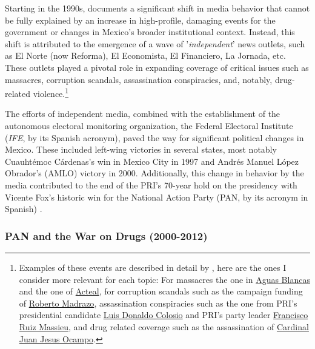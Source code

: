 Starting in the 1990s, \cite{FourthState-Lawson-Book} documents a significant shift in media behavior that cannot be fully explained by an increase in high-profile, damaging events for the government or changes in Mexico's broader institutional context. Instead, this shift is attributed to the emergence of a wave of '\textit{independent}' news outlets, such as El Norte (now Reforma), El Economista, El Financiero, La Jornada, etc. These outlets played a pivotal role in expanding coverage of critical issues such as massacres, corruption scandals, assassination conspiracies, and, notably, drug-related violence.\footnote{Examples of these events are described in detail by \cite{FourthState-Lawson-Book}, here are the ones I consider more relevant for each topic: For massacres the one in \href{https://www.theadvocatesforhumanrights.org/Res/guerrero_1995_2.pdf}{Aguas Blancas} and the one of \href{https://www.amnesty.org/en/wp-content/uploads/2021/06/amr410431998en.pdf}{Acteal}, for corruption scandals such as the campaign funding of \href{https://elpais.com/diario/2000/10/25/internacional/972424820_850215.html}{Roberto Madrazo}, assassination conspiracies such as the one from PRI's presidential candidate \href{https://www.jornada.com.mx/noticia/2024/03/23/politica/al-cumplirse-30-anos-del-asesinato-de-colosio-el-caso-esta-abierto-ahora-se-habla-de-una-accion-concertada-4892}{Luis Donaldo Colosio} and PRI's party leader \href{https://www.milenio.com/policia/jose-francisco-ruiz-massieu-quien-lo-mato-y-por-que}{Francisco Ruiz Massieu}, and drug related coverage such as the assassination of \href{https://www.aciprensa.com/Docum/posadas.htm}{Cardinal Juan Jesus Ocampo}.}

The efforts of independent media, combined with the establishment of the autonomous electoral monitoring organization, the Federal Electoral Institute (\textit{IFE}, by its Spanish acronym), paved the way for significant political changes in Mexico. These included left-wing victories in several states, most notably Cuauhtémoc Cárdenas's win in Mexico City in 1997 and Andrés Manuel López Obrador's (AMLO) victory in 2000. Additionally, this change in behavior by the media contributed to the end of the PRI's 70-year hold on the presidency with Vicente Fox's historic win for the National Action Party (PAN, by its acronym in Spanish) \citep{Lawson-AMLO}.

\subsubsection*{PAN and the War on Drugs (2000-2012)}

